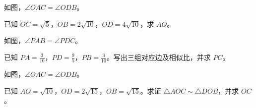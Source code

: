 \documentclass{exam-zh}
\begin{document}

\begin{problem}[points=10]
  \noindent
  \begin{minipage}[t]{\dimexpr\linewidth-60mm-6mm\relax}
    \vspace{0pt}
    如图，$\angle OAC=\angle ODB$。

已知 $OC=\sqrt{5}$，$OB=2\sqrt{10}$，$OD=4\sqrt{10}$，求 $AO$。
    
  \end{minipage}\hfill
  \begin{diagramcoltikz}{60mm}{先用对顶角补齐第二组等角，再按顶点顺序配边。}
  }
  \end{diagramcoltikz}
  \par\medskip
  \answerarea[48mm]
\end{problem}



\begin{problem}[points=10]
  \noindent
  \begin{minipage}[t]{\dimexpr\linewidth-60mm-6mm\relax}
    \vspace{0pt}
    如图，$\angle PAB=\angle PDC$。

已知 $PA=\frac{3}{10}$，$PD=\frac{9}{5}$，$PB=\frac{3}{10}$。写出三组对应边及相似比，并求 $PC$。
    
  \end{minipage}\hfill
  \begin{diagramcoltikz}{60mm}{沿题设等角的顶点顺序，找出两组三角形的对应边。}
  }
  \end{diagramcoltikz}
  \par\medskip
  \answerarea[48mm]
\end{problem}



\begin{problem}[points=10]
  \noindent
  \begin{minipage}[t]{\dimexpr\linewidth-60mm-6mm\relax}
    \vspace{0pt}
    如图，$\angle OAC=\angle ODB$。

已知 $AO=\sqrt{10}$，$OD=2\sqrt{15}$，$OB=\sqrt{15}$。求证 $\triangle AOC\sim\triangle DOB$，并求 $OC$。
    
  \end{minipage}\hfill
  \begin{diagramcoltikz}{60mm}{先用对顶角补齐第二组等角，再按顶点顺序配边。}
  }
  \end{diagramcoltikz}
  \par\medskip
  \answerarea[48mm]
\end{problem}
\end{document}
